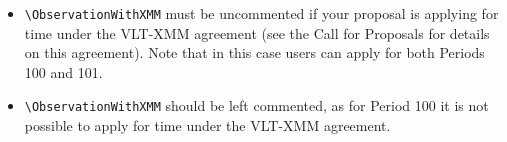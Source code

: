 \documentclass{article}
\begin{document}
\ifodd\period
 \begin{itemize}
  \item \verb|\ObservationWithXMM| must be uncommented if your proposal
   is applying for time under the VLT-XMM agreement (see the Call for
   Proposals for details on this agreement).  Note that in this case
   users can apply for both Periods 100 and 101.
 \end{itemize}
\else
 \begin{itemize}
 \item \verb|\ObservationWithXMM| should be left commented, as for
   Period 100 it is not possible to apply for time under the
   VLT-XMM agreement.
 \end{itemize}
\fi

\end{document}
